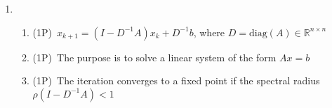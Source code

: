 {\color{solution}
\begin{enumerate}
	\item 
	
	\begin{enumerate}
		\item 	\textcolor{exampoints}{(1P)}~$x_{k+1} = (I-D^{-1}A)x_k + D^{-1}b$, where $D = \text{diag}(A)\in\mathbb{R}^{n\times n}$\\
	\item	\textcolor{exampoints}{(1P)}~The purpose is to solve a linear system of the form $Ax = b$\\
	\item	\textcolor{exampoints}{(1P)}~The iteration converges to a fixed point if the spectral radius $\rho(I-D^{-1}A) <1$
	\end{enumerate}


\end{enumerate}}
